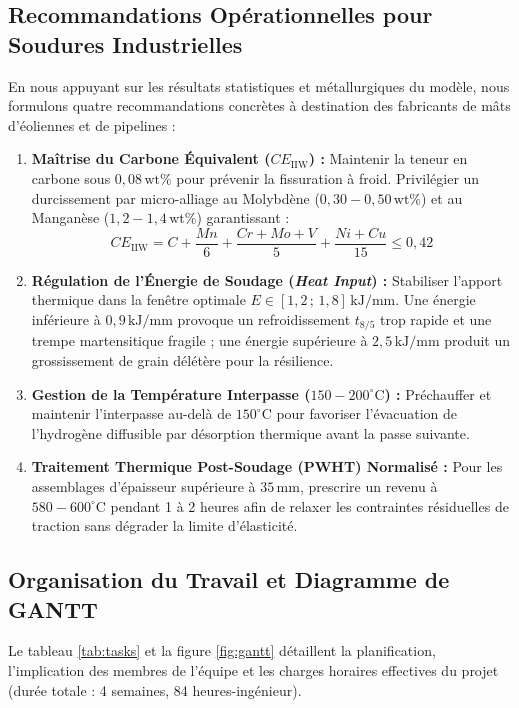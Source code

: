 \documentclass[11pt,a4paper]{article}
\begin{document}
\subsection{Recommandations Opérationnelles pour Soudures Industrielles}
En nous appuyant sur les résultats statistiques et métallurgiques du modèle, nous formulons quatre recommandations concrètes à destination des fabricants de mâts d'éoliennes et de pipelines :
\begin{enumerate}
    \item \textbf{Maîtrise du Carbone Équivalent ($CE_{\text{IIW}}$) :}
    Maintenir la teneur en carbone sous $0{,}08\,\text{wt}\%$ pour prévenir la fissuration à froid. Privilégier un durcissement par micro-alliage au Molybdène ($0{,}30 - 0{,}50\,\text{wt}\%$) et au Manganèse ($1{,}2 - 1{,}4\,\text{wt}\%$) garantissant :
    \begin{equation}
        CE_{\text{IIW}} = C + \frac{Mn}{6} + \frac{Cr+Mo+V}{5} + \frac{Ni+Cu}{15} \le 0{,}42
    \end{equation}
    \item \textbf{Régulation de l'Énergie de Soudage (\textit{Heat Input}) :}
    Stabiliser l'apport thermique dans la fenêtre optimale $E \in [1{,}2 \,;\, 1{,}8]\,\text{kJ/mm}$. Une énergie inférieure à $0{,}9\,\text{kJ/mm}$ provoque un refroidissement $t_{8/5}$ trop rapide et une trempe martensitique fragile ; une énergie supérieure à $2{,}5\,\text{kJ/mm}$ produit un grossissement de grain délétère pour la résilience.
    \item \textbf{Gestion de la Température Interpasse ($150 - 200^\circ\text{C}$) :}
    Préchauffer et maintenir l'interpasse au-delà de $150^\circ\text{C}$ pour favoriser l'évacuation de l'hydrogène diffusible par désorption thermique avant la passe suivante.
    \item \textbf{Traitement Thermique Post-Soudage (PWHT) Normalisé :}
    Pour les assemblages d'épaisseur supérieure à $35\,\text{mm}$, prescrire un revenu à $580-600^\circ\text{C}$ pendant 1 à 2 heures afin de relaxer les contraintes résiduelles de traction sans dégrader la limite d'élasticité.
\end{enumerate}

\subsection{Organisation du Travail et Diagramme de GANTT}
Le tableau \ref{tab:tasks} et la figure \ref{fig:gantt} détaillent la planification, l'implication des membres de l'équipe et les charges horaires effectives du projet (durée totale : 4 semaines, 84 heures-ingénieur).
\end{document}
